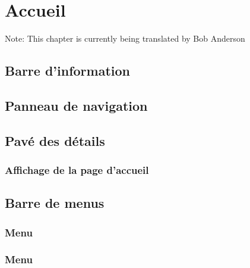 
\chapter{Accueil\label{home}}

Note: This chapter is currently being translated by Bob Anderson

\section{Barre d'information\label{home-synthesis}}

\section{Panneau de navigation\label{home-accounting}}


\section{Pavé des détails\label{home-details}}

 
\subsection{Affichage de la page d'accueil\label{home-details-homepage}}


\section{Barre de menus\label{home-menus}}


\subsection{Menu \label{home-menus-file}}



\subsection{Menu \label{home-menus-edit}}


